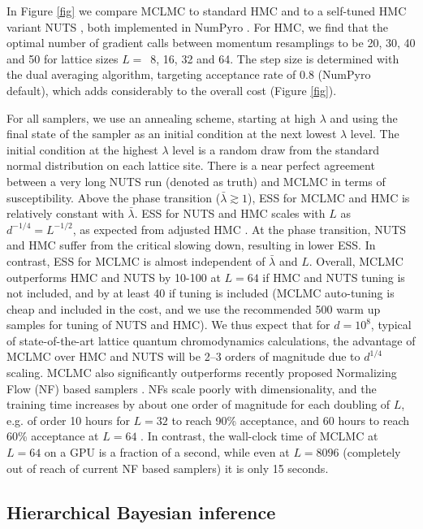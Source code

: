 \documentclass[tablecaption=bottom,wcp]{jmlr} %
\begin{document}
In Figure \ref{fig} we compare MCLMC to standard HMC \citep{HMCDuane} and to a self-tuned HMC variant NUTS \citep{NUTS}, both implemented in NumPyro \citep{NummPyro}.
For HMC, we find that the optimal number of 
gradient calls between momentum 
resamplings to be 20, 30, 40 and 50 for lattice sizes $L = \,$ 8, 16, 32 and 64.
The step size is determined with the dual averaging algorithm, targeting acceptance rate of 0.8 (NumPyro default), which adds considerably to the overall cost (Figure \ref{fig}).

For all samplers, we use an annealing scheme, starting at high $\lambda$ and using the final state of the sampler as an initial condition at the next lowest $\lambda$ level. The initial condition at the highest $\lambda$ level is a random draw from the standard normal distribution on each lattice site.
There is
a near perfect agreement between a very long NUTS run (denoted as truth) and 
MCLMC in terms of susceptibility.
Above the phase transition ($\bar{\lambda} \gtrsim 1$), ESS for MCLMC and HMC
is relatively constant with 
$\bar{\lambda}$. ESS for NUTS and HMC 
scales with $L$ as $d^{-1/4}=L^{-1/2}$, as 
expected from adjusted HMC \citep{NealHandbook}. At the 
phase transition, NUTS and HMC 
suffer from the critical slowing 
down, resulting in lower ESS. 
In contrast, ESS for
MCLMC is almost independent of $\bar{\lambda}$ and $L$. 
Overall, MCLMC outperforms HMC and NUTS by 10-100 at $L=64$ if HMC and NUTS tuning is not included, and by at least 40 if tuning is included (MCLMC auto-tuning is cheap and included in the cost, and we use the recommended 500 warm up samples for tuning of NUTS and HMC). 
We thus expect that for $d=10^8$, typical of state-of-the-art lattice quantum chromodynamics calculations, the advantage of MCLMC over HMC and NUTS will be 2–3 orders of magnitude due to $d^{1/4}$ scaling.
MCLMC also significantly outperforms recently proposed Normalizing Flow (NF) based samplers \citep{rezende,gerdes}. NFs scale poorly with dimensionality, and the training time increases by about one order of magnitude for each doubling of $L$, e.g. of order 10 hours for $L=32$ to reach 90\% acceptance, and 
60 hours to reach 60\% acceptance
at $L=64$ \citep{gerdes}. In contrast, 
the wall-clock time of MCLMC at $L=64$ on a GPU is a fraction of a second, while even at $L=8096$ (completely out of reach of current NF based samplers) it is only 15 seconds. 

\subsection{Hierarchical Bayesian inference}
\end{document}
